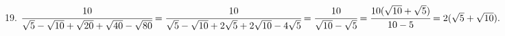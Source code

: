 19. $\cfrac{10}{\sqrt{5}-\sqrt{10}+\sqrt{20}+\sqrt{40}-\sqrt{80}}=\cfrac{10}{\sqrt{5}-\sqrt{10}+2\sqrt{5}+2\sqrt{10}-4\sqrt{5}}=
\cfrac{10}{\sqrt{10}-\sqrt{5}}=\cfrac{10(\sqrt{10}+\sqrt{5})}{10-5}=2(\sqrt{5}+\sqrt{10}).$\\
